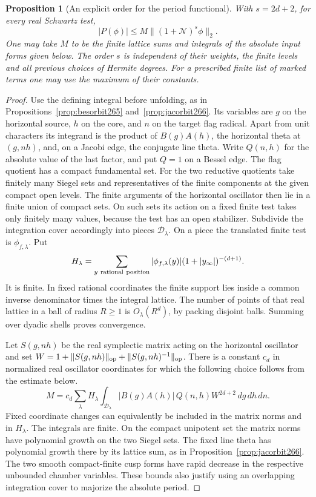 \documentclass[a4paper,11pt]{article}
\newtheorem{proposition}{Proposition}[section]
\theoremstyle{definition}
\theoremstyle{remark}
\numberwithin{equation}{section}
\begin{document}
\begin{proposition}[An explicit order for the period functional]\leavevmode
\label{prop:order268}
With \(s=2d+2\), for every real Schwartz test,
\[
            |P(\phi)|\le M\|(1+\mathcal N)^s\phi\|_2 .
\]
One may take \(M\) to be the finite lattice sums and integrals
of the absolute input forms given below. The order \(s\)
is independent of their weights, the finite levels and all
previous choices of Hermite degrees. For a prescribed finite
list of marked terms one may use the maximum of their constants.
\end{proposition}
\begin{proof}
Use the defining integral before unfolding, as in
Propositions~\ref{prop:besorbit265} and~\ref{prop:jacorbit266}.
Its variables are \(g\) on the horizontal source, \(h\) on
the core, and \(n\) on the target flag radical. Apart from
unit characters its integrand is the product of \(B(g)A(h)\),
the horizontal theta at \((g,nh)\), and, on a Jacobi edge,
the conjugate line theta. Write \(Q(n,h)\) for the absolute
value of the last factor, and put \(Q=1\) on a Bessel edge.
The flag quotient has a compact fundamental set. For the two
reductive quotients take finitely many Siegel sets and
representatives of the finite components at the given compact
open levels. The finite arguments of the horizontal oscillator
then lie in a finite union of compact sets. On such sets its
action on a fixed finite test takes only finitely many values,
because the test has an open stabilizer. Subdivide the
integration cover accordingly into pieces \(\mathcal D_\lambda\).
On a piece the translated finite test is \(\phi_{f,\lambda}\).
Put
\[
 H_\lambda=\sum_{y\ {\rm rational\ position}}
         |\phi_{f,\lambda}(y)|(1+|y_\infty|)^{-(d+1)} .
\]
It is finite. In fixed rational coordinates the finite
support lies inside a common inverse denominator times the
integral lattice. The number of points of that real lattice
in a ball of radius \(R\ge1\) is \(O_\lambda(R^d)\), by
packing disjoint balls. Summing over dyadic shells proves
convergence.

Let \(S(g,nh)\) be the real symplectic matrix acting on the
horizontal oscillator and set
\(W=1+\|S(g,nh)\|_{\rm op}+\|S(g,nh)^{-1}\|_{\rm op}\).
There is a constant \(c_d\) in normalized real oscillator
coordinates for which the following choice follows from the estimate below.
\[
 M=c_d\sum_\lambda H_\lambda
       \int_{\mathcal D_\lambda}|B(g)A(h)|\,Q(n,h)
                          W^{2d+2}\,dg\,dh\,dn .
\]
Fixed coordinate changes can equivalently be included in the
matrix norms and in \(H_\lambda\). The integrals are finite. On the compact unipotent set the matrix norms have polynomial
growth on the two Siegel sets. The fixed line theta has
polynomial growth there by its lattice sum, as in
Proposition~\ref{prop:jacorbit266}. The two smooth
compact-finite cusp forms have rapid decrease in the
respective unbounded chamber variables. These bounds also
justify using an overlapping integration cover to majorize
the absolute period.


\end{proof}
\end{document}
